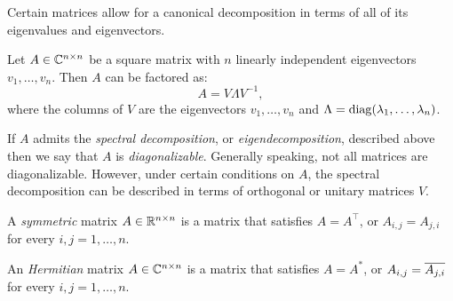 Certain matrices allow for a canonical decomposition in terms of all of its eigenvalues and eigenvectors.

\begin{definition}
Let $A\in\mathbb{C}^{n\times n}$ be a square matrix with $n$ linearly independent eigenvectors $v_1,\ldots,v_n$. Then $A$ can be factored as:
\[
A = V\Lambda V^{-1},
\]
where the columns of $V$ are the eigenvectors $v_1,\ldots,v_n$ and $\Lambda = \operatorname{diag}(\lambda_1,\ldots,\lambda_n)$.
\end{definition}
If $A$ admits the {\em spectral decomposition}, or {\em eigendecomposition}, described above then we say that $A$ is {\em diagonalizable}. Generally speaking, not all matrices are diagonalizable. However, under certain conditions on $A$, the spectral decomposition can be described in terms of orthogonal or unitary matrices $V$.

\begin{definition}
A {\em symmetric} matrix $A\in\mathbb{R}^{n\times n}$ is a matrix that satisfies $A=A^\top$, or $A_{i,j} = A_{j,i}$ for every $i,j=1,\ldots,n$.
\end{definition}

\begin{definition}
An {\em Hermitian} matrix $A\in\mathbb{C}^{n\times n}$ is a matrix that satisfies $A=A^*$, or $A_{i,j} = \overline{A_{j,i}}$ for every $i,j=1,\ldots,n$.
\end{definition}

